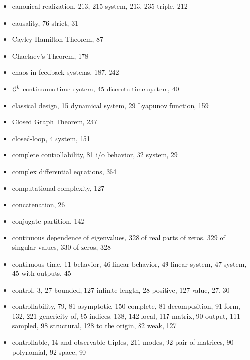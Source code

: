\begin{itemize}
  \item canonical
    \subitem realization, 213, 215
    \subitem system, 213, 235
    \subitem triple, 212
  \item causality, 76
    \subitem strict, 31
  \item Cayley-Hamilton Theorem, 87
  \item Chaetaev's Theorem, 178
  \item chaos in feedback systems, 187, 242
  \item ${\cal C}^k$
    \subitem continuous-time system, 45
    \subitem discrete-time system, 40
  \item classical
    \subitem design, 15
    \subitem dynamical system, 29
    \subitem Lyapunov function, 159
  \item Closed Graph Theorem, 237
  \item closed-loop, 4
    \subitem system, 151
  \item complete
    \subitem controllability, 81
    \subitem i/o behavior, 32
    \subitem system, 29
  \item complex differential equations, 354
  \item computational complexity, 127
  \item concatenation, 26
  \item conjugate partition, 142
  \item continuous dependence
    \subitem of eigenvalues, 328
    \subitem of real parts of zeros, 329
    \subitem of singular values, 330
    \subitem of zeros, 328
  \item continuous-time, 11
    \subitem behavior, 46
    \subitem linear behavior, 49
    \subitem linear system, 47
    \subitem system, 45
      \subsubitem with outputs, 45
  \item control, 3, 27
    \subitem bounded, 127
    \subitem infinite-length, 28
    \subitem positive, 127
    \subitem value, 27, 30
  \item controllability, 79, 81
    \subitem asymptotic, 150
    \subitem complete, 81
    \subitem decomposition, 91
    \subitem form, 132, 221
    \subitem genericity of, 95
    \subitem indices, 138, 142
    \subitem local, 117
    \subitem matrix, 90
    \subitem output, 111
    \subitem sampled, 98
    \subitem structural, 128
    \subitem to the origin, 82
    \subitem weak, 127
  \item controllable, 14
    \subitem and observable triples, 211
    \subitem modes, 92
    \subitem pair of matrices, 90
    \subitem polynomial, 92
    \subitem space, 90

\end{itemize}
